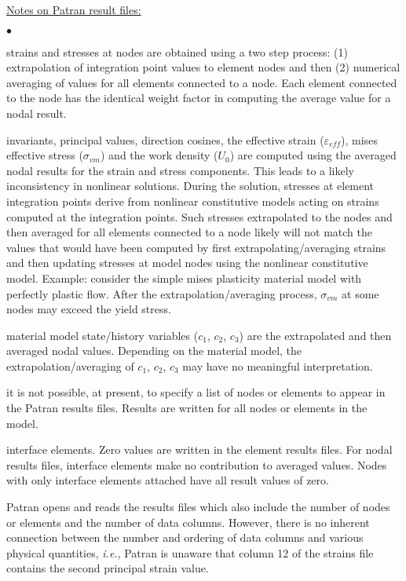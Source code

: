 \documentclass[11pt]{report}
\numberwithin{equation}{section}
\newcommand{\nin} {\noindent}
\newcommand{\ul} {\underline}
\newcommand{\veps}{\varepsilon}
\newcommand{\ie}{\emph{i.e.},\xspace}
\newcommand{\squishlist}{
 \begin{list}{$\bullet$}
  { \setlength{\itemsep}{0pt}
     \setlength{\parsep}{3pt}
     \setlength{\topsep}{3pt}
     \setlength{\partopsep}{0pt}
     \setlength{\leftmargin}{1.5em}
     \setlength{\labelwidth}{1em}
     \setlength{\labelsep}{0.5em} } }
\newcommand{\squishend}{
  \end{list}  }
\begin{document}
\nin \ul{Notes on Patran result files:}
\small
\squishlist
\item strains
and stresses at nodes are obtained using a two step process: (1) extrapolation
of integration point values to element nodes and then (2) numerical averaging of
values for all elements connected to a node. Each element connected to the node has the
identical weight factor in computing the average value for a nodal result.
\item invariants, principal values, direction cosines, the effective strain 
($\veps_{eff}$), mises effective stress ($\sigma_{vm}$) and the work density ($U_0$) are 
computed using the averaged nodal results for the strain and stress
components. This leads to a likely inconsistency in nonlinear solutions. During the 
solution, stresses
at element integration points derive from nonlinear constitutive models
acting on strains computed at the integration points. Such stresses extrapolated to
the nodes and then averaged for all elements connected to a node likely
will not match the values that would have been computed by first extrapolating/averaging 
strains and then updating stresses at model nodes using the nonlinear
constitutive model. Example: consider the simple mises plasticity material model with 
perfectly plastic flow. After the extrapolation/averaging process, $\sigma_{vm}$
at some nodes may exceed the yield stress.
\item material model state/history
variables ($c_1$, $c_2$, $c_3$) are the extrapolated and 
then averaged nodal values. Depending on the material model, the extrapolation/averaging
of $c_1$, $c_2$, $c_3$ may have no meaningful interpretation.
\item it is not possible, at present, to specify a list of nodes or elements to appear in
the Patran results files. Results are written for all nodes or elements in the model.
\item interface elements.  Zero values are written in the  element results files.
 For nodal results files, interface elements make no contribution to averaged values.
 Nodes with only interface elements attached have all result values of zero.
\squishend
\normalsize

Patran opens and reads the results files which also include
the number of nodes or elements and the number of data columns.
However, there is no inherent connection between the number and ordering 
of data columns and various physical quantities, \ie Patran is unaware
that column 12 of the strains file contains the second principal
strain value. 
\end{document}
